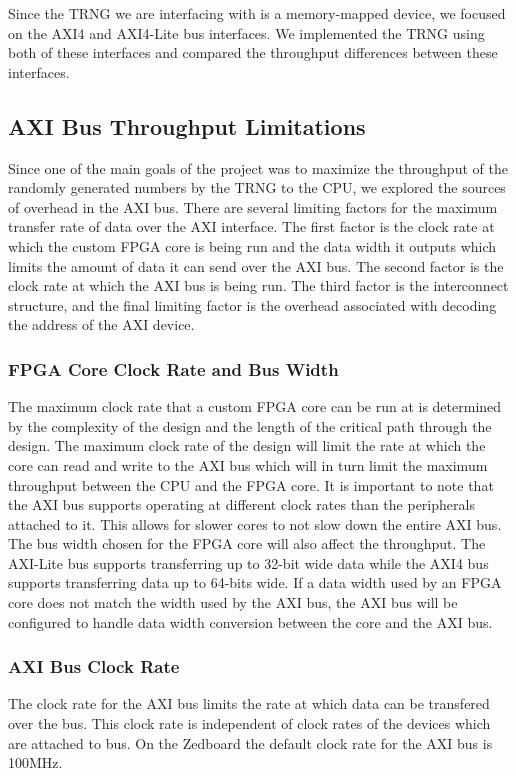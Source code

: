 \documentclass[journal]{IEEEtran}
\begin{document}
Since the TRNG we are interfacing with is a memory-mapped device, we focused on the AXI4 and AXI4-Lite bus interfaces. We implemented the TRNG using both of these interfaces and compared the throughput differences between these interfaces. 


\subsection{AXI Bus Throughput Limitations}

Since one of the main goals of the project was to maximize the throughput of the randomly generated numbers by the TRNG to the CPU, we explored the sources of overhead in the AXI bus. There are several limiting factors for the maximum transfer rate of data over the AXI interface. The first factor is the clock rate at which the custom FPGA core is being run and the data width it outputs which limits the amount of data it can send over the AXI bus. The second factor is the clock rate at which the AXI bus is being run. The third factor is the interconnect structure, and the final limiting factor is the overhead associated with decoding the address of the AXI device. \\


\subsubsection{FPGA Core Clock Rate and Bus Width}
The maximum clock rate that a custom FPGA core can be run at is determined by the complexity of the design and the length of the critical path through the design. The maximum clock rate of the design will limit the rate at which the core can read and write to the AXI bus which will in turn limit the maximum throughput between the CPU and the FPGA core. It is important to note that the AXI bus supports operating at different clock rates than the peripherals attached to it. This allows for slower cores to not slow down the entire AXI bus. The bus width chosen for the FPGA core will also affect the throughput. The AXI-Lite bus supports transferring up to 32-bit wide data while the AXI4 bus supports transferring data up to 64-bits wide. If a data width used by an FPGA core does not match the width used by the AXI bus, the AXI bus will be configured to handle data width conversion between the core and the AXI bus. \cite{AXI_Reference_Guide} \\


\subsubsection{AXI Bus Clock Rate}
The clock rate for the AXI bus limits the rate at which data can be transfered over the bus. This clock rate is independent of clock rates of the devices which are attached to bus. On the Zedboard the default clock rate for the AXI bus is 100MHz. \\
\end{document}
